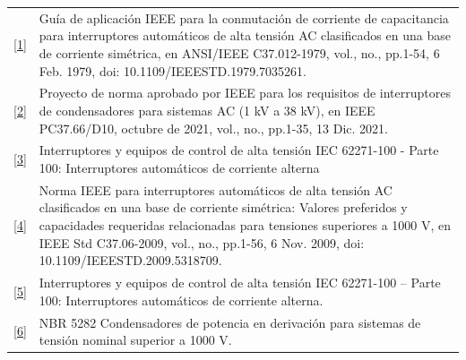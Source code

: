 \documentclass[a4paper]{article}
\begin{document}
	\noindent
	\begin{tabular}{p{0.2cm} p{15.8cm}}
		\href{https://ieeexplore.ieee.org/document/7035261}{[1]} &
		\begin{minipage}[t]{15.8cm}
			Guía de aplicación IEEE para la conmutación de corriente de capacitancia para interruptores automáticos de alta tensión AC clasificados en una base de corriente simétrica, en ANSI/IEEE C37.012-1979, vol., no., pp.1-54, 6 Feb. 1979, doi: 10.1109/IEEESTD.1979.7035261.
		\end{minipage} \\
		
		\href{https://ieeexplore.ieee.org/document/9574631}{[2]} &
		\begin{minipage}[t]{15.8cm}
			Proyecto de norma aprobado por IEEE para los requisitos de interruptores de condensadores para sistemas AC (1 kV a 38 kV), en IEEE PC37.66/D10, octubre de 2021, vol., no., pp.1-35, 13 Dic. 2021.
		\end{minipage} \\
		
		
		\href{https://webstore.iec.ch/publication/62785}{[3]} &
		\begin{minipage}[t]{15.8cm}
			Interruptores y equipos de control de alta tensión IEC 62271-100 - Parte 100: Interruptores automáticos de corriente alterna
		\end{minipage} \\
		
    \href{https://ieeexplore.ieee.org/document/5318709}{[4]} &
\begin{minipage}[t]{15.8cm}
	Norma IEEE para interruptores automáticos de alta tensión AC clasificados en una base de corriente simétrica: Valores preferidos y capacidades requeridas relacionadas para tensiones superiores a 1000 V, en IEEE Std C37.06-2009, vol., no., pp.1-56, 6 Nov. 2009, doi: 10.1109/IEEESTD.2009.5318709.
\end{minipage} \\

\href{https://cdn.standards.iteh.ai/samples/101972/4e7e06bd66d2443da668b8e0c6c60512/IEC-62271-100-2021.pdf}{[5]} &
\begin{minipage}[t]{15.8cm}
	Interruptores y equipos de control de alta tensión IEC 62271-100 – Parte 100: Interruptores automáticos de corriente alterna.
\end{minipage} \\

\href{https://www.normas.com.br/autorizar/visualizacao-nbr/313/identificar/visitante}{[6]} &
\begin{minipage}[t]{15.8cm}
	NBR 5282 Condensadores de potencia en derivación para sistemas de tensión nominal superior a 1000 V.
\end{minipage} \\
\end{tabular}
\end{document}
